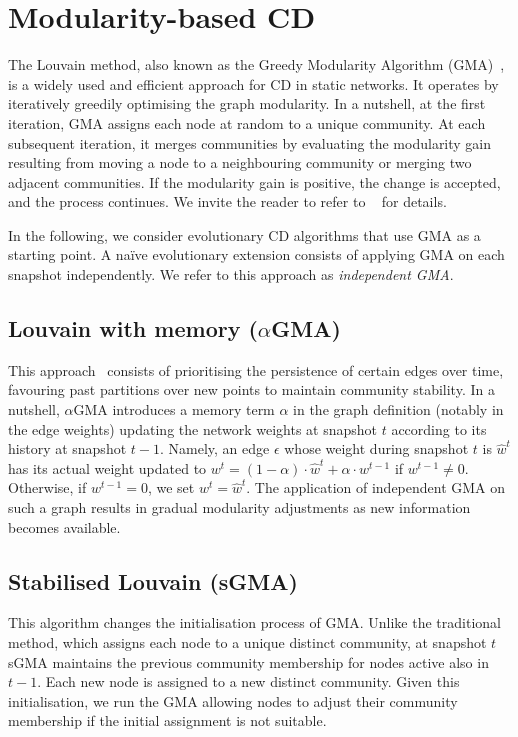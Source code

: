 \documentclass[letterpaper]{article}
\begin{document}
\section{Modularity-based CD}
\label{s:algorithms}

The Louvain method, also known as the Greedy Modularity Algorithm (GMA)~\cite{blondel2008louvain}, is a widely used and efficient approach for CD in static networks. It operates by iteratively greedily optimising the graph modularity. In a nutshell, at the first iteration, GMA assigns each node at random to a unique community. At each subsequent iteration, it merges communities by evaluating the modularity gain resulting from moving a node to a neighbouring community or merging two adjacent communities. If the modularity gain is positive, the change is accepted, and the process continues. We invite the reader to refer to ~\cite{blondel2008louvain} for details.

In the following, we consider evolutionary CD algorithms that use GMA as a starting point. A na\"ive evolutionary extension consists of applying GMA on each snapshot independently. We refer to this approach as \emph{independent GMA}.

\subsection{Louvain with memory ($\alpha$GMA)}
This approach~\cite{elegazzar2021alpha} consists of prioritising the persistence of certain edges over time, favouring past partitions over new points to maintain community stability.  In a nutshell, $\alpha$GMA introduces a memory term  $\alpha$ in the graph definition (notably in the edge weights) updating the network weights at snapshot $t$ according to its history at snapshot $t-1$.
Namely, an edge $\epsilon$ whose weight during snapshot $t$ is  $\hat{w}^t$ has its actual weight updated to
{$w^t = (1-\alpha)\cdot \hat{w}^t + \alpha \cdot  w^{t-1}$} if $w^{t-1}\neq 0$. Otherwise, if $w^{t-1} = 0$, we set $w^t = \hat{w}^t$.
The application of independent GMA on such a graph results in gradual modularity adjustments as new information becomes available.

\subsection{Stabilised Louvain (sGMA)} This algorithm changes the initialisation process of GMA. Unlike the traditional method, which assigns each node to a unique distinct community, at snapshot $t$ sGMA maintains the previous community membership for nodes active also in $t-1$. Each new node is assigned to a new distinct community. Given this initialisation, we run the GMA allowing nodes to adjust their community membership if the initial assignment is not suitable.
\end{document}
